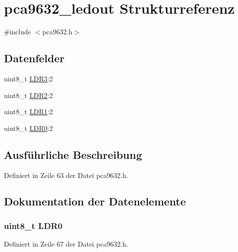 \hypertarget{structpca9632__ledout}{}\section{pca9632\+\_\+ledout Strukturreferenz}
\label{structpca9632__ledout}


{\ttfamily \#include $<$pca9632.\+h$>$}

\subsection*{Datenfelder}
\begin{DoxyCompactItemize}
\item 
uint8\+\_\+t \hyperlink{structpca9632__ledout_ad197abe248f500fd016e0bb552d21fd3}{L\+D\+R3}\+:2
\item 
uint8\+\_\+t \hyperlink{structpca9632__ledout_af190ba57ddaccfb3782dc14637a0a893}{L\+D\+R2}\+:2
\item 
uint8\+\_\+t \hyperlink{structpca9632__ledout_adf175f05578de85a5511e6fa73c7243d}{L\+D\+R1}\+:2
\item 
uint8\+\_\+t \hyperlink{structpca9632__ledout_ab7411c217fe50b467b62cc602598b53c}{L\+D\+R0}\+:2
\end{DoxyCompactItemize}


\subsection{Ausführliche Beschreibung}


Definiert in Zeile 63 der Datei pca9632.\+h.



\subsection{Dokumentation der Datenelemente}
\hypertarget{structpca9632__ledout_ab7411c217fe50b467b62cc602598b53c}{}
\subsubsection[{L\+D\+R0}]{\setlength{\rightskip}{0pt plus 5cm}uint8\+\_\+t L\+D\+R0}\label{structpca9632__ledout_ab7411c217fe50b467b62cc602598b53c}


Definiert in Zeile 67 der Datei pca9632.\+h.

\hypertarget{structpca9632__ledout_adf175f05578de85a5511e6fa73c7243d}{}

